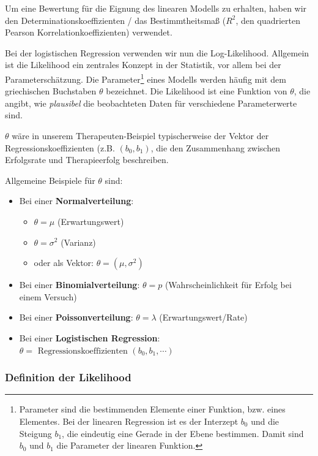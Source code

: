 \documentclass[
]{article}
\providecommand{\tightlist}{%
  \setlength{\itemsep}{0pt}\setlength{\parskip}{0pt}}
\begin{document}
Um eine Bewertung für die Eignung des linearen Modells zu erhalten, haben wir den Determinationskoeffizienten / das Bestimmtheitsmaß (\(R^2\), den quadrierten Pearson Korrelationkoeffizienten) verwendet.

Bei der logistischen Regression verwenden wir nun die Log-Likelihood. Allgemein ist die Likelihood ein zentrales Konzept in der Statistik, vor allem bei der Parameterschätzung. Die Parameter\footnote{Parameter sind die bestimmenden Elemente einer Funktion, bzw. eines Elementes. Bei der linearen Regression ist es der Interzept \(b_0\) und die Steigung \(b_1\), die eindeutig eine Gerade in der Ebene bestimmen. Damit sind \(b_0\) und \(b_1\) die Parameter der linearen Funktion.} eines Modells werden häufig mit dem griechischen Buchstaben \(\theta\) bezeichnet. Die Likelihood ist eine Funktion von \(\theta\), die angibt, wie \emph{plausibel} die beobachteten Daten für verschiedene Parameterwerte sind.

\(\theta\) wäre in unserem Therapeuten-Beispiel typischerweise der Vektor der Regressionskoeffizienten (z.B. \((b_0, b_1)\), die den Zusammenhang zwischen Erfolgsrate und Therapieerfolg beschreiben.

Allgemeine Beispiele für \(\theta\) sind:

\begin{itemize}
\tightlist
\item
  Bei einer \textbf{Normalverteilung}:

  \begin{itemize}
  \tightlist
  \item
    \(\theta = \mu\) (Erwartungswert)
  \item
    \(\theta = \sigma^2\) (Varianz)
  \item
    oder als Vektor: \(\theta = (\mu, \sigma^2)\)
  \end{itemize}
\item
  Bei einer \textbf{Binomialverteilung}: \(\theta = p\) (Wahrscheinlichkeit für Erfolg bei einem Versuch)
\item
  Bei einer \textbf{Poissonverteilung}: \(\theta = \lambda\) (Erwartungswert/Rate)
\item
  Bei einer \textbf{Logistischen Regression}: \(\theta = \text{ Regressionskoeffizienten } (b_0, b_1, \cdots)\)
\end{itemize}

\subsubsection{Definition der Likelihood}\label{definition-der-likelihood}
\end{document}
